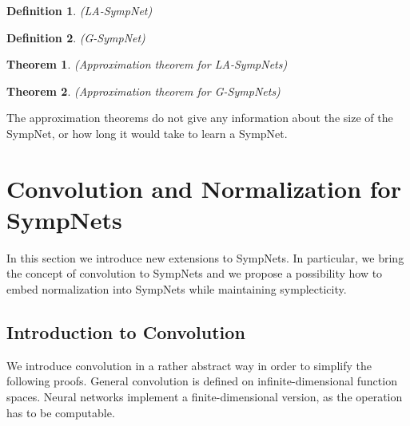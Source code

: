 \documentclass[twoside,a4paper]{article}
\newtheorem{definition}{Definition}
\newtheorem{theorem}{Theorem}
\begin{document}
\begin{definition}\label{def_la_sympnet}
	(LA-SympNet)
\end{definition}

\begin{definition}\label{def_g_sympnet}
	(G-SympNet)
\end{definition}

\begin{theorem}
	(Approximation theorem for LA-SympNets)
\end{theorem}

\begin{theorem}
	(Approximation theorem for G-SympNets)
\end{theorem}

The approximation theorems do not give any information
about the size of the SympNet, or how long it would take to learn a SympNet.


\section{Convolution and Normalization for SympNets}

In this section we introduce new extensions to SympNets. In particular, we bring the concept
of convolution to SympNets and we propose a possibility how to embed normalization into SympNets while
maintaining symplecticity.

\subsection{Introduction to Convolution}


We introduce convolution in a rather abstract way in order to simplify the following proofs.
General convolution is defined on infinite-dimensional function spaces.
Neural networks implement a finite-dimensional version, as the operation has to be
computable.
\end{document}
